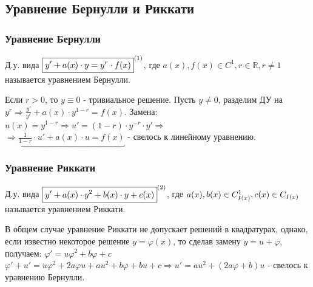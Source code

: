 \subsection{Уравнение Бернулли и Риккати}
\subsubsection{Уравнение Бернулли}

\begin{definition}
	Д.у. вида $ \boxed{y' + a(x)\cdot y = y^r \cdot f(x)}^{\eqnum\label{eq:Ber}} $, где $ a(x), f(x) \in C^1, r \in \mathbb{ R }, r \neq 1$ называется уравнением Бернулли. \\
\end{definition}

\begin{proposition} %
	Если $ r > 0 $, то $ y \equiv 0 $ - тривиальное решение. Пусть $ y \neq 0$, разделим ДУ на $ y^r \Rightarrow \frac{ y' }{ y^r } + a(x) \cdot y^{ 1-r } = f(x).$ Замена: $ u(x) = y^{ 1-r } \Rightarrow u' = ( 1-r ) \cdot y^{ -r } \cdot y' \Rightarrow$ \\ $\Rightarrow \underbracket{ \frac{ 1 }{ 1-r } \cdot u' + a(x)\cdot u = f(x) }$ - свелось к линейному уравнению. 
\end{proposition}

\subsubsection{Уравнение Риккати}

\begin{definition}
	Д.у. вида $ \boxed{y' + a(x) \cdot y^2 + b(x) \cdot y + c(x)}^{\eqnum\label{eq:Ric}} $, где $a(x),  b(x) \in C^1_{I(x)},  \\ c(x) \in C_{I(x)}$ называется уравнением Риккати. 
\end{definition}

\begin{proposition}	
	В общем случае уравнение Риккати не допускает решений в квадратурах, однако, если известно некоторое решение $ y = \varphi (x) $, то сделав замену $ y = u + \varphi $, получаем: $ \varphi' = u \varphi^2 + b\varphi + c $ \\ $ \varphi' + u' = u\varphi^2 + 2a\varphi u + au^2 + b\varphi + bu + c \Rightarrow u' = au^2 + (2a\varphi + b)u $ - свелось к уравнению Бернулли.
\end{proposition}

